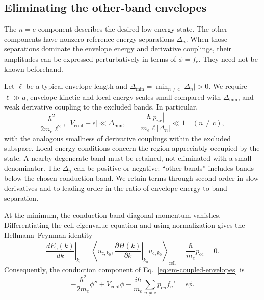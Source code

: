 \subsection{Eliminating the other-band envelopes}
\label{sec:em-band-elimination}

The $n=\mathrm c$ component describes the desired low-energy
state. The other components have nonzero reference energy
separations $\Delta_n$. When those separations dominate the
envelope energy and derivative couplings, their amplitudes can
be expressed perturbatively in terms of $\phi=f_{\mathrm c}$.
They need not be known beforehand.

Let $\ell$ be a typical envelope length and
$\Delta_{\min}=\min_{n\ne\mathrm c}|\Delta_n|>0$.
We require $\ell\gg a$, envelope kinetic and local energy scales
small compared with $\Delta_{\min}$, and weak derivative coupling
to the excluded bands. In particular,
\begin{equation}
  \frac{\hbar^2}{2m_e\ell^2},\ |V_{\mathrm{conf}}-\epsilon|
        \ll\Delta_{\min},
  \qquad
  \frac{\hbar|p_{n\mathrm c}|}
       {m_e\ell|\Delta_n|}\ll1
       \quad(n\ne\mathrm c),
  \label{eq:em-elimination-conditions}
\end{equation}
with the analogous smallness of derivative couplings within
the excluded subspace. Local energy conditions concern the
region appreciably occupied by the state. A nearby degenerate
band must be retained, not eliminated with a small denominator.
The $\Delta_n$ can be positive or negative: ``other bands''
includes bands below the chosen conduction band.
We retain terms through second order in slow derivatives and
to leading order in the ratio of envelope energy to band separation.

At the minimum, the conduction-band diagonal momentum vanishes.
Differentiating the cell eigenvalue equation and using normalization
gives the Hellmann--Feynman identity
\begin{equation}
  \left.\frac{dE_{\mathrm c}(k)}{dk}\right|_{k_0}
      =\left\langle u_{\mathrm c,k_0},
        \left.\frac{\partial H(k)}{\partial k}\right|_{k_0}
          u_{\mathrm c,k_0}\right\rangle_{\mathrm{cell}}
      =\frac{\hbar}{m_e}p_{\mathrm{cc}}=0.
  \label{eq:em-zero-group-velocity}
\end{equation}
Consequently, the conduction component of
Eq.~\eqref{eq:em-coupled-envelopes} is
\begin{equation}
  -\frac{\hbar^2}{2m_e}\phi''+V_{\mathrm{conf}}\phi
    -\frac{i\hbar}{m_e}\sum_{n\ne\mathrm c}p_{\mathrm c n}f_n'
       =\epsilon\phi.
  \label{eq:em-conduction-envelope}
\end{equation}

